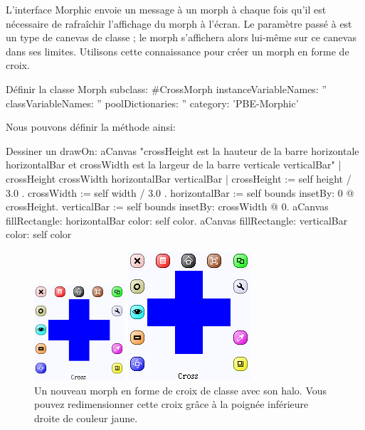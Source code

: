 \documentclass[a4paper,10pt,twoside]{book}
\begin{document}
L'interface Morphic envoie un message  à un morph à
chaque fois qu'il est nécessaire de rafraîchir l'affichage du
morph à l'écran. Le paramètre passé à  est un
type de canevas de classe ; le morph s'affichera alors
lui-même sur ce canevas dans ses limites. %
Utilisons cette connaissance pour créer un morph en forme de croix.

\begin{classdef}{Définir la classe }
Morph subclass: #CrossMorph
	instanceVariableNames: ''
	classVariableNames: ''
	poolDictionaries: ''
	category: 'PBE-Morphic'
\end{classdef}

Nous pouvons définir la méthode  ainsi:
\begin{method}[firstDrawOn]{Dessiner un }
drawOn: aCanvas 
	"crossHeight est la hauteur de la barre horizontale horizontalBar
    et crossWidth est la largeur de la barre verticale verticalBar"
    | crossHeight crossWidth horizontalBar verticalBar |
	crossHeight := self height / 3.0 .
	crossWidth := self width / 3.0 .
	horizontalBar := self bounds insetBy: 0 @ crossHeight.
	verticalBar := self bounds insetBy: crossWidth @ 0.
	aCanvas fillRectangle: horizontalBar color: self color.
	aCanvas fillRectangle: verticalBar color: self color
\end{method}


\begin{figure}[hbt]
	\ifluluelse
		{\centerline{\includegraphics[width=0.3\textwidth]{NewCross}}}
		{\centerline{\includegraphics{NewCross}}}
	\caption{Un nouveau morph en forme de croix de classe
       avec son halo. Vous pouvez redimensionner cette
      croix grâce à la poignée inférieure droite
      de couleur jaune.\label{fig:cross}}
\end{figure}
\end{document}
